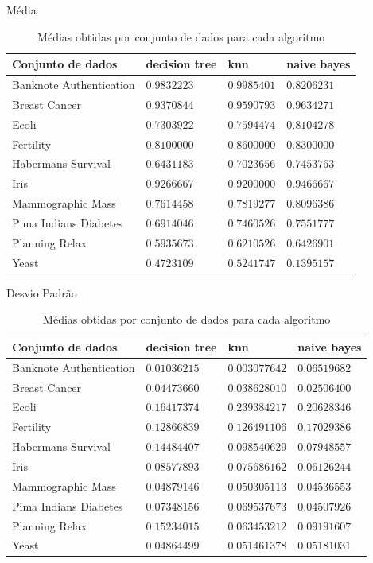\documentclass[12pt, a4paper]{article}
\begin{document}
\begin{table}[!ht]
\centering
\caption{Médias obtidas por conjunto de dados para cada algoritmo}
\label{acuracias}

Média\\
\begin{tabular}{|l|l|l|l|}
\hline
Conjunto de dados & decision tree & knn & naive bayes \\
\hline                              
Banknote Authentication		&$0.9832223$ &$0.9985401$   &$0.8206231$\\
Breast Cancer               &$0.9370844$ &$0.9590793$   &$0.9634271$\\
Ecoli                       &$0.7303922$ &$0.7594474$   &$0.8104278$\\
Fertility                   &$0.8100000$ &$0.8600000$   &$0.8300000$\\
Habermans Survival          &$0.6431183$ &$0.7023656$   &$0.7453763$\\
Iris                        &$0.9266667$ &$0.9200000$   &$0.9466667$\\
Mammographic Mass           &$0.7614458$ &$0.7819277$   &$0.8096386$\\
Pima Indians Diabetes       &$0.6914046$ &$0.7460526$   &$0.7551777$\\
Planning Relax              &$0.5935673$ &$0.6210526$   &$0.6426901$\\
Yeast                       &$0.4723109$ &$0.5241747$   &$0.1395157$\\

\hline
\end{tabular}

\vspace{0.5cm}
Desvio Padrão\\
\begin{tabular}{|l|l|l|l|}
\hline                              
Conjunto de dados & decision tree & knn & naive bayes\\
\hline
Banknote Authentication    &$0.01036215$ &$ 0.003077642 $ &$ 0.06519682$\\
Breast Cancer              &$0.04473660$ &$ 0.038628010 $ &$ 0.02506400$\\
Ecoli                      &$0.16417374$ &$ 0.239384217 $ &$ 0.20628346$\\
Fertility                  &$0.12866839$ &$ 0.126491106 $ &$ 0.17029386$\\
Habermans Survival         &$0.14484407$ &$ 0.098540629 $ &$ 0.07948557$\\
Iris                       &$0.08577893$ &$ 0.075686162 $ &$ 0.06126244$\\
Mammographic Mass          &$0.04879146$ &$ 0.050305113 $ &$ 0.04536553$\\
Pima Indians Diabetes      &$0.07348156$ &$ 0.069537673 $ &$ 0.04507926$\\
Planning Relax             &$0.15234015$ &$ 0.063453212 $ &$ 0.09191607$\\
Yeast                      &$0.04864499$ &$ 0.051461378 $ &$ 0.05181031$\\


\end{tabular}
\end{table}
\end{document}
